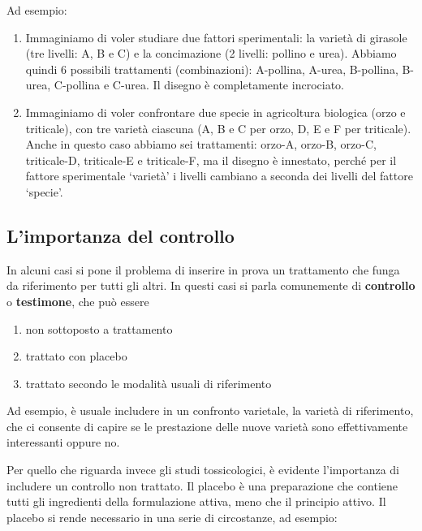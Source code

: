 \documentclass[a4paper,12pt,oneside]{book}
\providecommand{\tightlist}{%
  \setlength{\itemsep}{0pt}\setlength{\parskip}{0pt}}
\begin{document}
Ad esempio:

\begin{enumerate}
\def\labelenumi{\arabic{enumi}.}
\tightlist
\item
  Immaginiamo di voler studiare due fattori sperimentali: la varietà di girasole (tre livelli: A, B e C) e la concimazione (2 livelli: pollino e urea). Abbiamo quindi 6 possibili trattamenti (combinazioni): A-pollina, A-urea, B-pollina, B-urea, C-pollina e C-urea. Il disegno è completamente incrociato.
\item
  Immaginiamo di voler confrontare due specie in agricoltura biologica (orzo e triticale), con tre varietà ciascuna (A, B e C per orzo, D, E e F per triticale). Anche in questo caso abbiamo sei trattamenti: orzo-A, orzo-B, orzo-C, triticale-D, triticale-E e triticale-F, ma il disegno è innestato, perché per il fattore sperimentale `varietà' i livelli cambiano a seconda dei livelli del fattore `specie'.
\end{enumerate}

\hypertarget{limportanza-del-controllo}{%
\subsection{L'importanza del controllo}\label{limportanza-del-controllo}}

In alcuni casi si pone il problema di inserire in prova un trattamento che funga da riferimento per tutti gli altri. In questi casi si parla comunemente di \textbf{controllo} o \textbf{testimone}, che può essere

\begin{enumerate}
\def\labelenumi{\arabic{enumi}.}
\tightlist
\item
  non sottoposto a trattamento
\item
  trattato con placebo
\item
  trattato secondo le modalità usuali di riferimento
\end{enumerate}

Ad esempio, è usuale includere in un confronto varietale, la varietà di riferimento, che ci consente di capire se le prestazione delle nuove varietà sono effettivamente interessanti oppure no.

Per quello che riguarda invece gli studi tossicologici, è evidente l'importanza di includere un controllo non trattato. Il placebo è una preparazione che contiene tutti gli ingredienti della formulazione attiva, meno che il principio attivo. Il placebo si rende necessario in una serie di circostanze, ad esempio:
\end{document}
